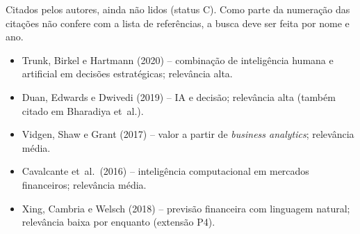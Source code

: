 Citados pelos autores, ainda não lidos (status C). Como parte da numeração das citações não confere com a lista de referências, a busca deve ser feita por nome e ano.

\begin{itemize}
  \item Trunk, Birkel e Hartmann (2020) --
        combinação de inteligência humana e
        artificial em decisões estratégicas;
        relevância alta.
  \item Duan, Edwards e Dwivedi (2019) -- IA e
        decisão; relevância alta (também citado em
        Bharadiya et~al.).
  \item Vidgen, Shaw e Grant (2017) -- valor a partir
        de \emph{business analytics}; relevância
        média.
  \item Cavalcante et~al.~(2016) -- inteligência
        computacional em mercados financeiros;
        relevância média.
  \item Xing, Cambria e Welsch (2018) -- previsão
        financeira com linguagem natural; relevância
        baixa por enquanto (extensão P4).
\end{itemize}